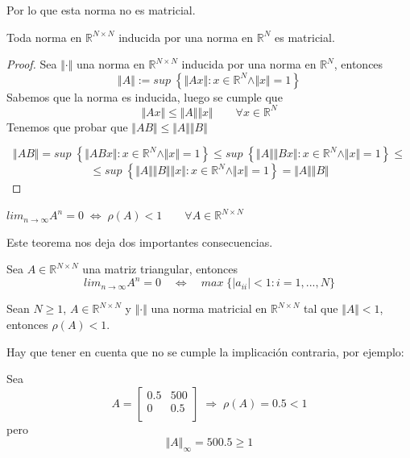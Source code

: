 Por lo que esta norma no es matricial.

\begin{nprop}
Toda norma en $\mathbb{R}^{N \times N}$ inducida por una norma en $\mathbb{R}^N$ es matricial.
\end{nprop}

\begin{proof}
Sea $\Vert \cdot \Vert$ una norma en $\mathbb{R}^{N \times N}$ inducida por una norma en $\mathbb{R}^N$, entonces
\[ \Vert A \Vert := sup \; \left\lbrace \Vert Ax \Vert : x \in \mathbb{R}^N \wedge \Vert x \Vert = 1 \right\rbrace \]
Sabemos que la norma es inducida, luego se cumple que
\[ \Vert Ax \Vert \leq \Vert A \Vert \Vert x \Vert \qquad \forall x \in \mathbb{R}^N \]
Tenemos que probar que $\Vert AB \Vert \leq \Vert A \Vert \Vert B \Vert$

\[ \Vert AB \Vert = sup \; \left\lbrace \Vert ABx \Vert : x \in \mathbb{R}^N \wedge \Vert x \Vert = 1 \right\rbrace \leq sup \; \left\lbrace \Vert A \Vert \Vert Bx \Vert : x \in \mathbb{R}^N \wedge \Vert x \Vert = 1 \right\rbrace \leq \] \[ \leq sup \; \left\lbrace \Vert A \Vert \Vert B \Vert \Vert x \Vert : x \in \mathbb{R}^N \wedge \Vert x \Vert = 1 \right\rbrace = \Vert A \Vert \Vert B \Vert \]
\end{proof}

\begin{nth}
$lim_{n \rightarrow \infty} A^n = 0 \; \Leftrightarrow \; \rho (A) < 1 \qquad \forall A \in \mathbb{R}^{N \times N} $
\end{nth}

Este teorema nos deja dos importantes consecuencias.

\begin{ncor}
Sea $A \in \mathbb{R}^{N \times N}$ una matriz triangular, entonces
\[ lim_{n \rightarrow \infty} A^n = 0 \quad \Leftrightarrow \quad max \; \lbrace \vert a_{ii} \vert < 1 : i = 1,...,N \rbrace \]
\end{ncor}

\begin{ncor}
Sean $N \geq 1$, $A \in \mathbb{R}^{N \times N}$ y $\Vert \cdot \Vert$ una norma matricial en $\mathbb{R}^{N \times N}$ tal que $\Vert A \Vert < 1$, entonces $\rho (A) < 1.$
\end{ncor}

Hay que tener en cuenta que no se cumple la implicación contraria, por ejemplo:

Sea $$A = \begin{bmatrix}
0.5 & 500 \\
0 & 0.5 \\
\end{bmatrix} \; \Rightarrow \; \rho (A) = 0.5 < 1$$
pero $$\Vert A \Vert _\infty = 500.5 \geq 1$$



